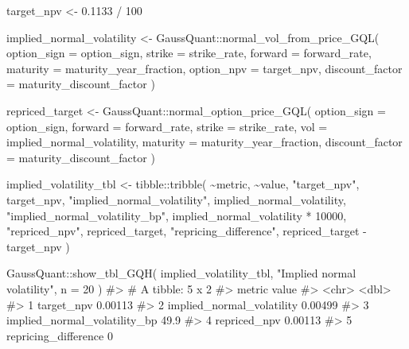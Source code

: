 \documentclass[
  letterpaper,
  DIV=11,
  numbers=noendperiod]{scrreprt}
\newenvironment{Shaded}{\begin{snugshade}}{\end{snugshade}}
\newcommand{\AttributeTok}[1]{\textcolor[rgb]{0.40,0.45,0.13}{#1}}
\newcommand{\CommentTok}[1]{\textcolor[rgb]{0.37,0.37,0.37}{#1}}
\newcommand{\DecValTok}[1]{\textcolor[rgb]{0.68,0.00,0.00}{#1}}
\newcommand{\FloatTok}[1]{\textcolor[rgb]{0.68,0.00,0.00}{#1}}
\newcommand{\FunctionTok}[1]{\textcolor[rgb]{0.28,0.35,0.67}{#1}}
\newcommand{\NormalTok}[1]{\textcolor[rgb]{0.00,0.23,0.31}{#1}}
\newcommand{\OtherTok}[1]{\textcolor[rgb]{0.00,0.23,0.31}{#1}}
\newcommand{\SpecialCharTok}[1]{\textcolor[rgb]{0.37,0.37,0.37}{#1}}
\newcommand{\StringTok}[1]{\textcolor[rgb]{0.13,0.47,0.30}{#1}}
\begin{document}
\begin{Shaded}
\begin{Highlighting}[]
\NormalTok{target\_npv }\OtherTok{\textless{}{-}} \FloatTok{0.1133} \SpecialCharTok{/} \DecValTok{100}

\NormalTok{implied\_normal\_volatility }\OtherTok{\textless{}{-}}\NormalTok{ GaussQuant}\SpecialCharTok{::}\FunctionTok{normal\_vol\_from\_price\_GQL}\NormalTok{(}
  \AttributeTok{option\_sign =}\NormalTok{ option\_sign,}
  \AttributeTok{strike =}\NormalTok{ strike\_rate,}
  \AttributeTok{forward =}\NormalTok{ forward\_rate,}
  \AttributeTok{maturity =}\NormalTok{ maturity\_year\_fraction,}
  \AttributeTok{option\_npv =}\NormalTok{ target\_npv,}
  \AttributeTok{discount\_factor =}\NormalTok{ maturity\_discount\_factor}
\NormalTok{)}

\NormalTok{repriced\_target }\OtherTok{\textless{}{-}}\NormalTok{ GaussQuant}\SpecialCharTok{::}\FunctionTok{normal\_option\_price\_GQL}\NormalTok{(}
  \AttributeTok{option\_sign =}\NormalTok{ option\_sign,}
  \AttributeTok{forward =}\NormalTok{ forward\_rate,}
  \AttributeTok{strike =}\NormalTok{ strike\_rate,}
  \AttributeTok{vol =}\NormalTok{ implied\_normal\_volatility,}
  \AttributeTok{maturity =}\NormalTok{ maturity\_year\_fraction,}
  \AttributeTok{discount\_factor =}\NormalTok{ maturity\_discount\_factor}
\NormalTok{)}

\NormalTok{implied\_volatility\_tbl }\OtherTok{\textless{}{-}}\NormalTok{ tibble}\SpecialCharTok{::}\FunctionTok{tribble}\NormalTok{(}
  \SpecialCharTok{\textasciitilde{}}\NormalTok{metric,                        }\SpecialCharTok{\textasciitilde{}}\NormalTok{value,}
  \StringTok{"target\_npv"}\NormalTok{,                   target\_npv,}
  \StringTok{"implied\_normal\_volatility"}\NormalTok{,    implied\_normal\_volatility,}
  \StringTok{"implied\_normal\_volatility\_bp"}\NormalTok{, implied\_normal\_volatility }\SpecialCharTok{*} \DecValTok{10000}\NormalTok{,}
  \StringTok{"repriced\_npv"}\NormalTok{,                 repriced\_target,}
  \StringTok{"repricing\_difference"}\NormalTok{,         repriced\_target }\SpecialCharTok{{-}}\NormalTok{ target\_npv}
\NormalTok{)}

\NormalTok{GaussQuant}\SpecialCharTok{::}\FunctionTok{show\_tbl\_GQH}\NormalTok{(}
\NormalTok{  implied\_volatility\_tbl,}
  \StringTok{"Implied normal volatility"}\NormalTok{,}
  \AttributeTok{n =} \DecValTok{20}
\NormalTok{)}
\CommentTok{\#\textgreater{} \# A tibble: 5 x 2}
\CommentTok{\#\textgreater{}   metric                          value}
\CommentTok{\#\textgreater{}   \textless{}chr\textgreater{}                           \textless{}dbl\textgreater{}}
\CommentTok{\#\textgreater{} 1 target\_npv                    0.00113}
\CommentTok{\#\textgreater{} 2 implied\_normal\_volatility     0.00499}
\CommentTok{\#\textgreater{} 3 implied\_normal\_volatility\_bp 49.9    }
\CommentTok{\#\textgreater{} 4 repriced\_npv                  0.00113}
\CommentTok{\#\textgreater{} 5 repricing\_difference          0}
\end{Highlighting}
\end{Shaded}
\end{document}
